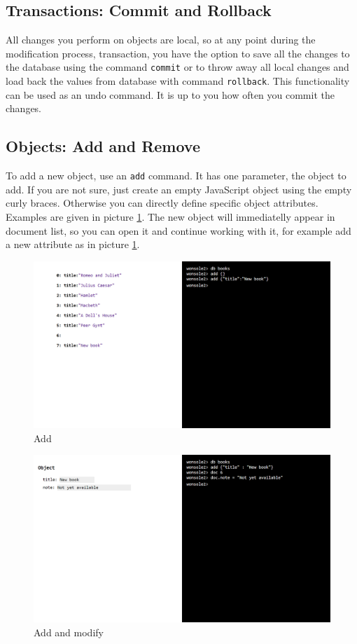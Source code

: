 \subsection{Transactions: Commit and Rollback}
All changes you perform on objects are local, so at any point during the
modification process, transaction, you have the option to save all the changes to the
database using the command \verb|commit| or to throw away all local changes and load
back the values from database with command \verb|rollback|. This functionality
can be used as an undo command. It is up to you how often you commit the
changes.


\subsection{Objects: Add and Remove}
To add a new object, use an \verb|add| command. It has one parameter, the object to
add. If you are not sure, just create an empty JavaScript object using the empty curly braces. Otherwise you can
directly define specific object attributes. Examples are given in picture \ref{wonsole2-48}. The
new object will immediatelly appear in document list, so you can open
it and continue working with it, for example add a new attribute as in picture
\ref{wonsole2-48}.


\begin{figure}
\centering
\includegraphics[width=\textwidth]{../../manual/screenshot/wonsole2/wonsole2-48.png}
\caption{Add}
\label{wonsole2-48}
\end{figure}

\begin{figure}
\centering
\includegraphics[width=\textwidth]{../../manual/screenshot/wonsole2/wonsole2-55.png}
\caption{Add and modify}
\label{wonsole2-55}
\end{figure}
